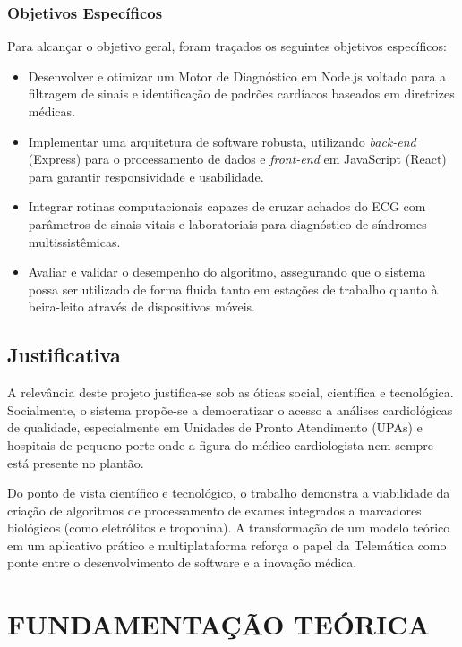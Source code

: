 \documentclass[portuguese,12pt,oneside,a4paper]{book}
\begin{document}
\subsection{Objetivos Específicos}
Para alcançar o objetivo geral, foram traçados os seguintes objetivos específicos:
\begin{itemize}
    \item Desenvolver e otimizar um Motor de Diagnóstico em Node.js voltado para a filtragem de sinais e identificação de padrões cardíacos baseados em diretrizes médicas.
    \item Implementar uma arquitetura de software robusta, utilizando \textit{back-end} (Express) para o processamento de dados e \textit{front-end} em JavaScript (React) para garantir responsividade e usabilidade.
    \item Integrar rotinas computacionais capazes de cruzar achados do ECG com parâmetros de sinais vitais e laboratoriais para diagnóstico de síndromes multissistêmicas.
    \item Avaliar e validar o desempenho do algoritmo, assegurando que o sistema possa ser utilizado de forma fluida tanto em estações de trabalho quanto à beira-leito através de dispositivos móveis.
\end{itemize}

\section{Justificativa}
A relevância deste projeto justifica-se sob as óticas social, científica e tecnológica. Socialmente, o sistema propõe-se a democratizar o acesso a análises cardiológicas de qualidade, especialmente em Unidades de Pronto Atendimento (UPAs) e hospitais de pequeno porte onde a figura do médico cardiologista nem sempre está presente no plantão. 

Do ponto de vista científico e tecnológico, o trabalho demonstra a viabilidade da criação de algoritmos de processamento de exames integrados a marcadores biológicos (como eletrólitos e troponina). A transformação de um modelo teórico em um aplicativo prático e multiplataforma reforça o papel da Telemática como ponte entre o desenvolvimento de software e a inovação médica.

\chapter{FUNDAMENTAÇÃO TEÓRICA}
\end{document}
